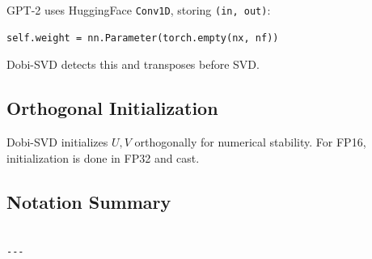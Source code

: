 GPT-2 uses HuggingFace \texttt{Conv1D}, storing \texttt{(in, out)}:

\begin{lstlisting}
self.weight = nn.Parameter(torch.empty(nx, nf))
\end{lstlisting}

Dobi-SVD detects this and transposes before SVD.

\subsection{Orthogonal Initialization}

Dobi-SVD initializes $U, V$ orthogonally for numerical stability. For 
FP16, initialization is done in FP32 and cast.

\subsection{Notation Summary}

\begin{lstlisting}

---
\end{lstlisting}